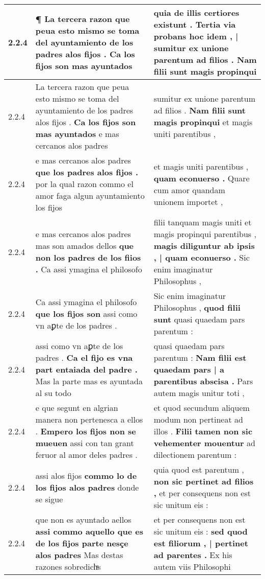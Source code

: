 \begin{tabular}{|p{1cm}|p{6.5cm}|p{6.5cm}|}
2.2.4 & ¶ \textbf{ La tercera razon que peua esto mismo se toma del ayuntamiento de los padres alos fijos . } Ca los fijos son mas ayuntados & quia de illis certiores existunt . \textbf{ Tertia via probans hoc idem , | sumitur ex unione parentum ad filios . } Nam filii sunt magis propinqui \\\hline
2.2.4 & La tercera razon que peua esto mismo se toma del ayuntamiento de los padres alos fijos . \textbf{ Ca los fijos son mas ayuntados } e mas cercanos alos padres & sumitur ex unione parentum ad filios . \textbf{ Nam filii sunt magis propinqui } et magis uniti parentibus , \\\hline
2.2.4 & e mas cercanos alos padres \textbf{ que los padres alos fijos . } por la qual razon commo el amor faga algun ayuntamiento los fijos & et magis uniti parentibus , \textbf{ quam econuerso . } Quare cum amor quandam unionem importet , \\\hline
2.2.4 & e mas cercanos alos padres mas son amados dellos \textbf{ que non los padres de los fiios . } Ca assi ymagina el philosofo & filii tanquam magis uniti et magis propinqui parentibus , \textbf{ magis diliguntur ab ipsis , | quam econuerso . } Sic enim imaginatur Philosophus , \\\hline
2.2.4 & Ca assi ymagina el philosofo \textbf{ que los fijos son } assi como vn aꝑte de los padres . & Sic enim imaginatur Philosophus , \textbf{ quod filii sunt } quasi quaedam pars parentum : \\\hline
2.2.4 & assi como vn aꝑte de los padres . \textbf{ Ca el fijo es vna part entaiada del padre . } Mas la parte mas es ayuntada al su todo & quasi quaedam pars parentum : \textbf{ Nam filii est quaedam pars | a parentibus abscisa . } Pars autem magis unitur toti , \\\hline
2.2.4 & e que segunt en algrian manera non pertenesca a ellos . \textbf{ Empero los fijos non se mueuen } assi con tan grant feruor al amor deles padres . & et quod secundum aliquem modum non pertineat ad illos . \textbf{ Filii tamen non sic vehementer mouentur } ad dilectionem parentum : \\\hline
2.2.4 & assi alos fijos \textbf{ commo lo de los fijos alos padres } donde se sigue & quia quod est parentum , \textbf{ non sic pertinet ad filios , } et per consequens non est sic unitum eis : \\\hline
2.2.4 & que non es ayuntado aellos \textbf{ assi commo aquello que es de los fijos parte nesçe alos padres } Mas destas razones sobredichͣs & et per consequens non est sic unitum eis : \textbf{ sed quod est filiorum , | pertinet ad parentes . } Ex his autem viis Philosophi \\\hline

\end{tabular}

